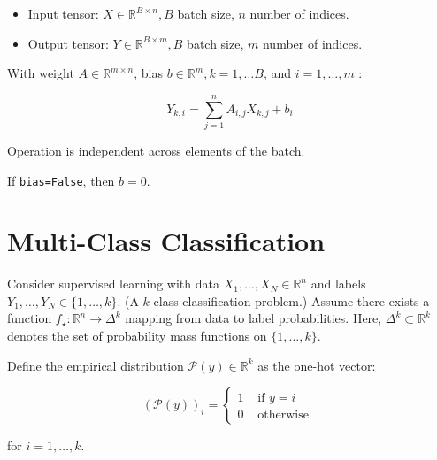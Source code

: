 \documentclass{report}
\begin{document}
\begin{definition}
    \begin{itemize}
        \item Input tensor: $X \in \mathbb{R}^{B \times n}, B$ batch size, $n$ number of indices.
        \item Output tensor: $Y \in \mathbb{R}^{B \times m}, B$ batch size, $m$ number of indices.
    \end{itemize}

    With weight $A \in \mathbb{R}^{m \times n}$, bias $b \in \mathbb{R}^{m}, k=1, \ldots B$, and $i=1, \ldots, m$ :

    $$
    Y_{k, i}=\sum_{j=1}^{n} A_{i, j} X_{k, j}+b_{i}
    $$

    Operation is independent across elements of the batch.

    If \verb|bias=False|, then $b=0$.
\end{definition}

\section{Multi-Class Classification}

\begin{definition}
    Consider supervised learning with data $X_{1}, \ldots, X_{N} \in \mathbb{R}^{n}$ and labels $Y_{1}, \ldots, Y_{N} \in\{1, \ldots, k\}$. (A $k$ class classification problem.) Assume there exists a function $f_{\star}: \mathbb{R}^{n} \rightarrow \Delta^{k}$ mapping from data to label probabilities. Here, $\Delta^{k} \subset \mathbb{R}^{k}$ denotes the set of probability mass functions on $\{1, \ldots, k\}$.

    Define the empirical distribution $\mathcal{P}(y) \in \mathbb{R}^{k}$ as the one-hot vector:

    $$
    (\mathcal{P}(y))_{i}=\left\{\begin{array}{cc}
    1 & \text { if } y=i \\
    0 & \text { otherwise }
    \end{array}\right.
    $$

    for $i=1, \ldots, k$.
\end{definition}
\end{document}
